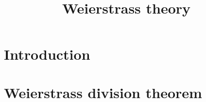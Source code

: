 
\title{Weierstrass theory}

\maketitle
\tableofcontents



\section{Introduction}\label{sec-introduction}

\section{Weierstrass division theorem}



\cite{stacks-project}

\printbibliography
